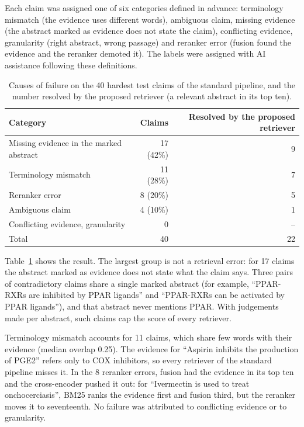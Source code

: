 Each claim was assigned one of six categories defined in advance: terminology mismatch (the
evidence uses different words), ambiguous claim, missing evidence (the abstract marked as
evidence does not state the claim), conflicting evidence, granularity (right abstract, wrong
passage) and reranker error (fusion found the evidence and the reranker demoted it). The labels
were assigned with AI assistance following these definitions.

\begin{table}[t]
\centering\small
\caption{Causes of failure on the 40 hardest test claims of the standard pipeline, and the number
resolved by the proposed retriever (a relevant abstract in its top ten).}
\label{tab:failures}
\begin{tabular}{@{}lrr@{}}
\toprule
Category & Claims & Resolved by the proposed retriever \\
\midrule
Missing evidence in the marked abstract & 17 (42\%) & 9 \\
Terminology mismatch & 11 (28\%) & 7 \\
Reranker error & 8 (20\%) & 5 \\
Ambiguous claim & 4 (10\%) & 1 \\
Conflicting evidence, granularity & 0 & -- \\
\midrule
Total & 40 & 22 \\
\bottomrule
\end{tabular}
\end{table}

Table~\ref{tab:failures} shows the result. The largest group is not a retrieval error: for 17
claims the abstract marked as evidence does not state what the claim says. Three pairs of
contradictory claims share a single marked abstract (for example, ``PPAR-RXRs are inhibited by
PPAR ligands'' and ``PPAR-RXRs can be activated by PPAR ligands''), and that abstract never
mentions PPAR. With judgements made per abstract, such claims cap the score of every retriever.

Terminology mismatch accounts for 11 claims, which share few words with their evidence (median
overlap 0.25). The evidence for ``Aspirin inhibits the production of PGE2'' refers only to COX
inhibitors, so every retriever of the standard pipeline misses it. In the 8 reranker errors,
fusion had the evidence in its top ten and the cross-encoder pushed it out: for ``Ivermectin is
used to treat onchocerciasis'', BM25 ranks the evidence first and fusion third, but the reranker
moves it to seventeenth. No failure was attributed to conflicting evidence or to granularity.

